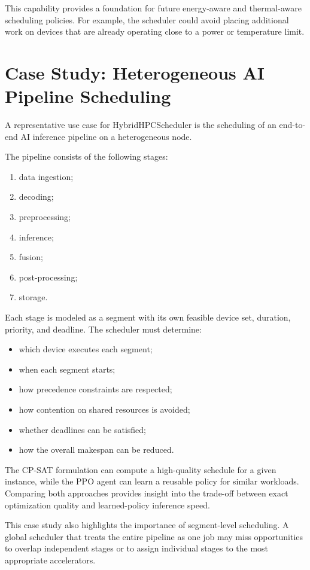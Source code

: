 \documentclass[conference]{IEEEtran}
\begin{document}
This capability provides a foundation for future energy-aware and thermal-aware
scheduling policies. For example, the scheduler could avoid placing additional
work on devices that are already operating close to a power or temperature
limit.

\section{Case Study: Heterogeneous AI Pipeline Scheduling}
A representative use case for HybridHPCScheduler is the scheduling of an
end-to-end AI inference pipeline on a heterogeneous node.

The pipeline consists of the following stages:
\begin{enumerate}
    \item data ingestion;
    \item decoding;
    \item preprocessing;
    \item inference;
    \item fusion;
    \item post-processing;
    \item storage.
\end{enumerate}

Each stage is modeled as a segment with its own feasible device set, duration,
priority, and deadline. The scheduler must determine:
\begin{itemize}
    \item which device executes each segment;
    \item when each segment starts;
    \item how precedence constraints are respected;
    \item how contention on shared resources is avoided;
    \item whether deadlines can be satisfied;
    \item how the overall makespan can be reduced.
\end{itemize}

The CP-SAT formulation can compute a high-quality schedule for a given
instance, while the PPO agent can learn a reusable policy for similar workloads.
Comparing both approaches provides insight into the trade-off between exact
optimization quality and learned-policy inference speed.

This case study also highlights the importance of segment-level scheduling. A
global scheduler that treats the entire pipeline as one job may miss
opportunities to overlap independent stages or to assign individual stages to
the most appropriate accelerators.
\end{document}
